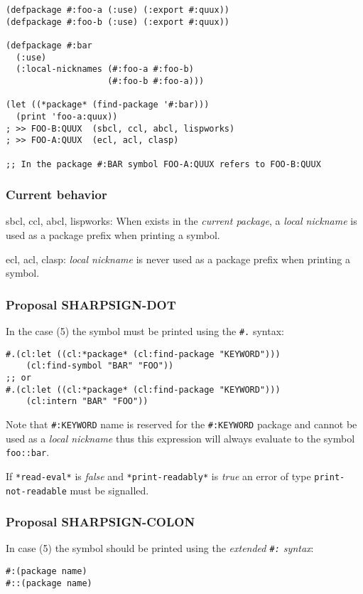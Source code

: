 \documentclass[11pt]{article}
\begin{document}
\begin{verbatim}
(defpackage #:foo-a (:use) (:export #:quux))
(defpackage #:foo-b (:use) (:export #:quux))

(defpackage #:bar
  (:use)
  (:local-nicknames (#:foo-a #:foo-b)
                    (#:foo-b #:foo-a)))

(let ((*package* (find-package '#:bar)))
  (print 'foo-a:quux))
; >> FOO-B:QUUX  (sbcl, ccl, abcl, lispworks)
; >> FOO-A:QUUX  (ecl, acl, clasp)

;; In the package #:BAR symbol FOO-A:QUUX refers to FOO-B:QUUX
\end{verbatim}
\subsubsection{Current behavior}
\label{sec:org221f00c}
sbcl, ccl, abcl, lispworks:
  When exists in the \emph{current package}, a \emph{local nickname} is used as a package
  prefix when printing a symbol.

ecl, acl, clasp:
  \emph{local nickname} is never used as a package prefix when printing a symbol.
\subsubsection{Proposal SHARPSIGN-DOT}
\label{sec:orgc9b50ba}
In the case (5) the symbol must be printed using the \texttt{\#.} syntax:

\begin{verbatim}
#.(cl:let ((cl:*package* (cl:find-package "KEYWORD")))
    (cl:find-symbol "BAR" "FOO"))
;; or
#.(cl:let ((cl:*package* (cl:find-package "KEYWORD")))
    (cl:intern "BAR" "FOO"))
\end{verbatim}

Note that \texttt{\#:KEYWORD} name is reserved for the \texttt{\#:KEYWORD} package and
cannot be used as a \emph{local nickname} thus this expression will always
evaluate to the symbol \texttt{foo::bar}.

If \texttt{*read-eval*} is \emph{false} and \texttt{*print-readably*} is \emph{true} an error of type
\texttt{print-not-readable} must be signalled.
\subsubsection{Proposal SHARPSIGN-COLON}
\label{sec:org82641f0}
In case (5) the symbol should be printed using the \emph{extended \texttt{\#:} syntax}:
\begin{verbatim}
#:(package name)
#::(package name)
\end{verbatim}
\end{document}
